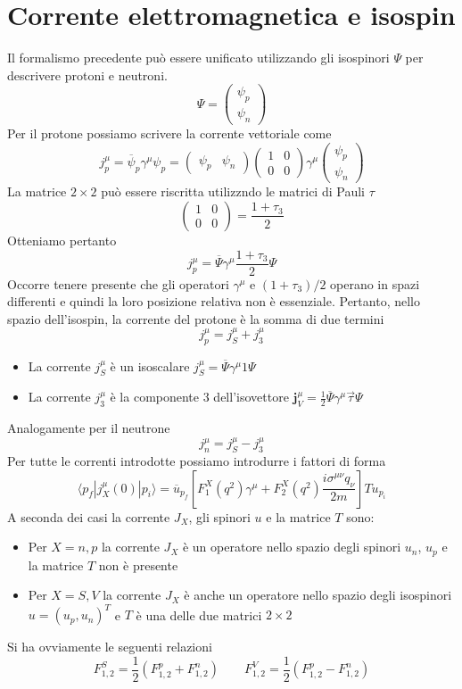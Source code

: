 \section{Corrente elettromagnetica e isospin}
Il formalismo precedente può essere unificato utilizzando gli isospinori $\Psi$ per descrivere protoni e neutroni. 
$$
\Psi = \begin{pmatrix} \psi_p \\ \psi_n \end{pmatrix}
$$
Per il protone possiamo scrivere la corrente vettoriale come
$$
j_p^\mu = \overline{\psi}_p \gamma^\mu \psi_p = \begin{pmatrix} \psi_p & \psi_n \end{pmatrix} \begin{pmatrix} 1 & 0 \\ 0 & 0 \end{pmatrix} \gamma^\mu \begin{pmatrix} \psi_p \\ \psi_n \end{pmatrix}
$$
La matrice $2\times2$ può essere riscritta utilizzndo le matrici di Pauli $\tau$
$$
\begin{pmatrix} 1 & 0 \\ 0 & 0 \end{pmatrix} = \frac{1 + \tau_3}{2}
$$
Otteniamo pertanto
$$
j_p^\mu = \overline{\Psi} \gamma^\mu \frac{1 + \tau_3}{2} \Psi
$$
Occorre tenere presente che gli operatori $\gamma^\mu$ e $(1+\tau_3)/2$ operano in spazi differenti e quindi la loro posizione relativa non è essenziale. Pertanto, nello spazio dell'isospin, la corrente del protone è la somma di due termini
$$
j_p^\mu = j_S^\mu + j_3^\mu
$$
\begin{itemize}
	\item La corrente $j_S^\mu$ è un isoscalare $j_S^\mu = \overline{\Psi} \gamma^\mu 1 \Psi$ 
	\item La corrente $j_3^\mu$ è la componente $3$ dell'isovettore $\mathbf{j}_V^\mu = \frac{1}{2} \overline{\Psi} \gamma^\mu \vec{\tau} \Psi$
\end{itemize}
Analogamente per il neutrone
$$
j_n^\mu = j_S^\mu - j_3^\mu
$$
Per tutte le correnti introdotte possiamo introdurre i fattori di forma
$$
\langle p_f | j_X^\mu (0) | p_i \rangle = \overline{u}_{p_f} \left[ F_1^X (q^2) \gamma^\mu + F_2^X (q^2) \frac{i\sigma^{\mu\nu} q_\nu}{2m} \right] T u_{p_i}
$$
A seconda dei casi la corrente $J_X$, gli spinori $u$ e la matrice $T$ sono:
\begin{itemize}
	\item Per $X=n,p$ la corrente $J_X$ è un operatore nello spazio degli spinori $u_n$, $u_p$ e la matrice $T$ non è presente
	\item Per $X=S, V$ la corrente $J_X$ è anche un operatore nello spazio degli isospinori $u=(u_p, u_n)^T$ e $T$ è una delle due matrici $2\times2$
\end{itemize}
Si ha ovviamente le seguenti relazioni
$$
F_{1,2}^S = \frac{1}{2} \left( F_{1,2}^p + F_{1,2}^n \right) \quad \quad F_{1,2}^V = \frac{1}{2} \left( F_{1,2}^p - F_{1,2}^n \right)
$$
